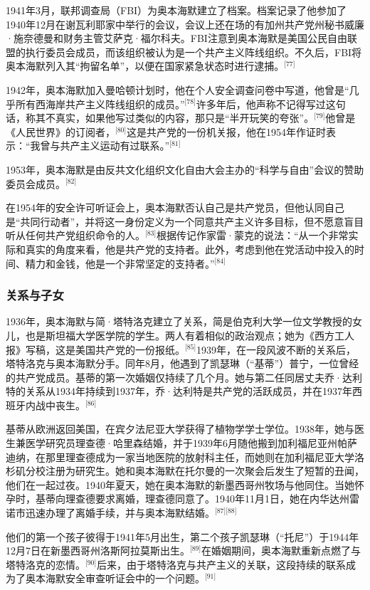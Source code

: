 1941年3月，联邦调查局（FBI）为奥本海默建立了档案。档案记录了他参加了1940年12月在谢瓦利耶家中举行的会议，会议上还在场的有加州共产党州秘书威廉·施奈德曼和财务主管艾萨克·福尔科夫。FBI注意到奥本海默是美国公民自由联盟的执行委员会成员，而该组织被认为是一个共产主义阵线组织。不久后，FBI将奥本海默列入其“拘留名单”，以便在国家紧急状态时进行逮捕。\(^\text{[77]}\)

1942年，奥本海默加入曼哈顿计划时，他在个人安全调查问卷中写道，他曾是“几乎所有西海岸共产主义阵线组织的成员。”\(^\text{[78]}\)许多年后，他声称不记得写过这句话，称其不真实，如果他写过类似的内容，那只是“半开玩笑的夸张”。\(^\text{[79]}\)他曾是《人民世界》的订阅者，\(^\text{[80]}\)这是共产党的一份机关报，他在1954年作证时表示：“我曾与共产主义运动有过联系。”\(^\text{[81]}\)

1953年，奥本海默是由反共文化组织文化自由大会主办的“科学与自由”会议的赞助委员会成员。\(^\text{[82]}\)

在1954年的安全许可听证会上，奥本海默否认自己是共产党员，但他认同自己是“共同行动者”，并将这一身份定义为一个同意共产主义许多目标，但不愿意盲目听从任何共产党组织命令的人。\(^\text{[83]}\)根据传记作家雷·蒙克的说法：“从一个非常实际和真实的角度来看，他是共产党的支持者。此外，考虑到他在党活动中投入的时间、精力和金钱，他是一个非常坚定的支持者。”\(^\text{[84]}\)
\subsubsection{关系与子女}
1936年，奥本海默与简·塔特洛克建立了关系，简是伯克利大学一位文学教授的女儿，也是斯坦福大学医学院的学生。两人有着相似的政治观点；她为《西方工人报》写稿，这是美国共产党的一份报纸。\(^\text{[85]}\)1939年，在一段风波不断的关系后，塔特洛克与奥本海默分手。同年8月，他遇到了凯瑟琳（“基蒂”）普宁，一位曾经的共产党成员。基蒂的第一次婚姻仅持续了几个月。她与第二任同居丈夫乔·达利特的关系从1934年持续到1937年，乔·达利特是共产党的活跃成员，并在1937年西班牙内战中丧生。\(^\text{[86]}\)

基蒂从欧洲返回美国，在宾夕法尼亚大学获得了植物学学士学位。1938年，她与医生兼医学研究员理查德·哈里森结婚，并于1939年6月随他搬到加利福尼亚州帕萨迪纳，在那里理查德成为一家当地医院的放射科主任，而她则在加利福尼亚大学洛杉矶分校注册为研究生。她和奥本海默在托尔曼的一次聚会后发生了短暂的丑闻，他们在一起过夜。1940年夏天，她在奥本海默的新墨西哥州牧场与他同住。当她怀孕时，基蒂向理查德要求离婚，理查德同意了。1940年11月1日，她在内华达州雷诺市迅速办理了离婚手续，并与奥本海默结婚。\(^\text{[87][88]}\)

他们的第一个孩子彼得于1941年5月出生，第二个孩子凯瑟琳（“托尼”）于1944年12月7日在新墨西哥州洛斯阿拉莫斯出生。\(^\text{[89]}\)在婚姻期间，奥本海默重新点燃了与塔特洛克的恋情。\(^\text{[90]}\)后来，由于塔特洛克与共产主义的关联，这段持续的联系成为了奥本海默安全审查听证会中的一个问题。\(^\text{[91]}\)

